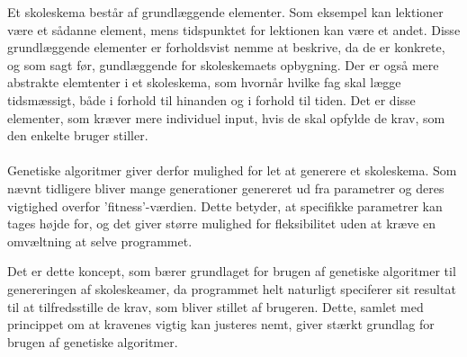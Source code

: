 Et skoleskema består af grundlæggende elementer. Som eksempel kan lektioner være et sådanne element, mens tidspunktet for lektionen kan være et andet. Disse grundlæggende elementer er forholdsvist nemme at beskrive, da de er konkrete, og som sagt før, gundlæggende for skoleskemaets opbygning. Der er også mere abstrakte elemtenter i et skoleskema, som hvornår hvilke fag skal lægge tidsmæssigt, både i forhold til hinanden og i forhold til tiden. Det er disse elementer, som kræver mere individuel input, hvis de skal opfylde de krav, som den enkelte bruger stiller.
\\\\
Genetiske algoritmer giver derfor mulighed for let at generere et skoleskema. Som nævnt tidligere bliver mange generationer genereret ud fra parametrer og deres vigtighed overfor 'fitness'-værdien. Dette betyder, at specifikke parametrer kan tages højde for, og det giver større mulighed for fleksibilitet uden at kræve en omvæltning at selve programmet. 

Det er dette koncept, som bærer grundlaget for brugen af genetiske algoritmer til genereringen af skoleskeamer, da programmet helt naturligt speciferer sit resultat til at tilfredsstille de krav, som bliver stillet af brugeren. Dette, samlet med princippet om at kravenes vigtig kan justeres nemt, giver stærkt grundlag for brugen af genetiske algoritmer.

